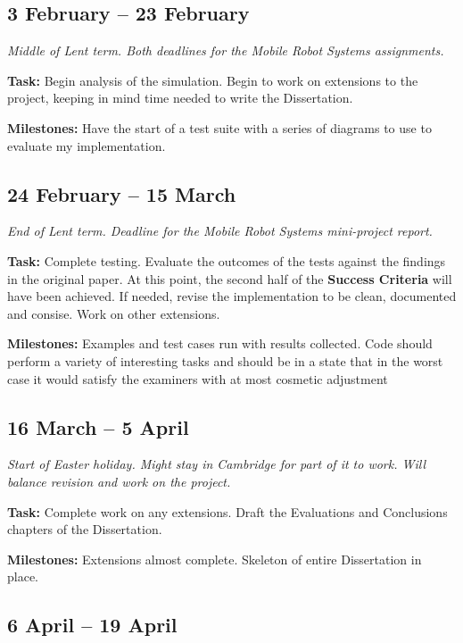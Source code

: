 \documentclass[12pt,a4paper,twoside]{article}
\begin{document}
\subsection*{3 February -- 23 February}

\emph{Middle of Lent term. Both deadlines for the Mobile Robot Systems assignments.}

{\bf Task:} Begin analysis of the simulation. Begin to work on extensions to the project, keeping in mind time needed to write the Dissertation.

{\bf Milestones:} Have the start of a test suite with a series of diagrams to use to evaluate my implementation.

\subsection*{24 February -- 15 March}

\emph{End of Lent term. Deadline for the Mobile Robot Systems mini-project report.}

{\bf Task:} Complete testing. Evaluate the outcomes of the tests against the findings in the original paper. At this point, the second half of the {\bf Success Criteria} will have been achieved. If needed, revise the implementation to be clean, documented and consise. Work on other extensions.

{\bf Milestones:} Examples and test cases run with results collected. Code should perform a variety of interesting tasks and should be in a state that in the worst case it would satisfy the examiners with at most cosmetic adjustment

\subsection*{16 March -- 5 April}

\emph{Start of Easter holiday. Might stay in Cambridge for part of it to work. Will balance revision and work on the project.}

{\bf Task:} Complete work on any extensions. Draft the Evaluations and Conclusions chapters of the Dissertation.

{\bf Milestones:} Extensions almost complete. Skeleton of entire Dissertation in place.

\subsection*{6 April -- 19 April}
\end{document}
